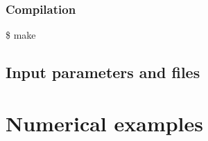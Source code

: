 \documentclass{gnulike}
\newcommand{\addbash}[1]{
	\begin{center}
	\colorbox{bashgray}{\begin{minipage}{0.9\textwidth}
  	\ttfamily \$ #1
\end{minipage}}
	\end{center}
}
\begin{document}
\subsection{Compilation}
\addbash{make}

\section{Input parameters and files}

\chapter{Numerical examples}

\begin{appendices}




\end{appendices}
  



\clearpage
\newpage
\thispagestyle{empty}
\printindex
\end{document}
